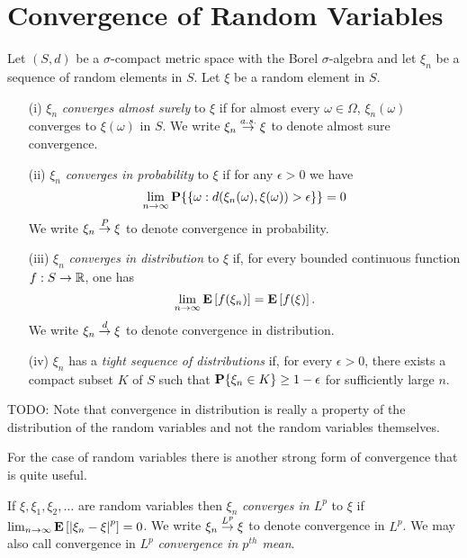 \chapter{Convergence of Random Variables}
\begin{defn}Let $(S,d)$ be a $\sigma$-compact metric space with the Borel
  $\sigma$-algebra and let $\xi_n$ be a sequence of random elements in
  $S$.  Let $\xi$ be a random element in $S$.
\begin{itemize}
\item[(i)] $\xi_n$ \emph{converges almost surely} to $\xi$ if for almost
  every $\omega \in \Omega$, $\xi_n(\omega)$ converges to $\xi(\omega)$ in $S$.
We write $\xi_n \overset{a.s.}\to \xi$ to denote almost sure convergence.
\item[(ii)] $\xi_n$ \emph{converges in probability} to $\xi$ if for any
  $\epsilon>0$ we have 
\begin{equation*}
\lim_{n \to \infty} \textbf{P}\{ \lbrace \omega : d(\xi_n(\omega),
      \xi(\omega)) >
      \epsilon \rbrace \} = 0
\end{equation*}
We write $\xi_n \overset{P}\to \xi$ to denote convergence in probability.
\item[(iii)] $\xi_n$ \emph{converges in distribution} to $\xi$ if, for
  every bounded continuous function $f:S \to \mathbb{R}$, one has 
\begin{equation*}
\lim_{n \to \infty} \textbf{E}\left[f(\xi_n)\right] = \textbf{E}\left[f(\xi)\right].
\end{equation*} 
We write $\xi_n \overset{d}\to \xi$ to denote convergence in distribution.
\item[(iv)] $\xi_n$ has a \emph{tight sequence of distributions} if, for
  every $\epsilon>0$, there exists a compact subset $K$ of $S$ such
  that $\textbf{P}\{\xi_n \in K\} \geq 1 - \epsilon$ for sufficiently
  large $n$.
\end{itemize}
\end{defn}

TODO: Note that convergence in distribution is really a property of
the distribution of the random variables and not the random variables
themselves.

For the case of random variables there is another strong form of
convergence that is quite useful.
\begin{defn}If $\xi, \xi_1, \xi_2, \dots$ are random variables then $\xi_n$ \emph{converges in $L^p$} to $\xi$ if 
$\lim_{n \to \infty} \textbf{E}\left[\left \vert \xi_n - \xi \right \vert^p\right] = 0$.
We write $\xi_n \overset{L^p}\to \xi$ to denote convergence in $L^p$.  We may
also call convergence in $L^p$ \emph{convergence in $p^{th}$ mean}.
\end{defn}

